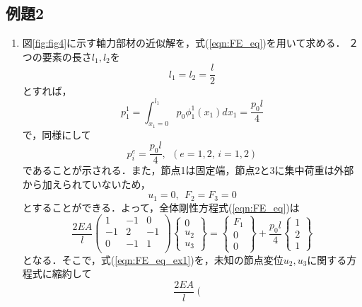 \documentclass[10pt,a4j]{jarticle}
\begin{document}
\subsection{例題2}
\begin{enumerate}
\item
図\ref{fig:fig4}に示す軸力部材の近似解を，式(\ref{eqn:FE_eq})を用いて求める．
２つの要素の長さ$l_1,l_2$を
\begin{equation}
	l_1=l_2=\frac{l}{2}
	\label{eqn:l1_l2}
\end{equation}
とすれば，
\begin{equation}
	p^1_1=\int_{x_1=0}^{l_1}p_0 \phi^1_1(x_1)dx_1=\frac{p_0l}{4}
	\label{eqn:}
\end{equation}
で，同様にして
\begin{equation}
	p^e_i=\frac{p_0l}{4}, \ \ (e=1,2,\, i=1,2)
	\label{eqn:}
\end{equation}
であることが示される．また，節点1は固定端，節点2と3に集中荷重は外部から加えられていないため，
\begin{equation}
	u_1=0, \ \ F_2=F_3=0
\end{equation}
とすることができる．よって，全体剛性方程式(\ref{eqn:FE_eq})は
\begin{equation}
	\frac{2EA}{l}
	\left(
	\begin{array}{ccc}
		1 & -1  & 0 \\
		-1 & 2 & -1 \\
		0 & -1 & 1  \\
	\end{array}
	\right)
	\left\{
	\begin{array}{c}
		0 \\
		u_2 \\
		u_3
	\end{array}
	\right\}
	=
	\left\{
	\begin{array}{c}
		F_1 \\
		0  \\
		0  
	\end{array}
	\right\}
	+
	\frac{p_0l}{4}
	\left\{
	\begin{array}{c}
		1 \\
		2 \\
		1	
	\end{array}
	\right\}
	\label{eqn:FE_eq_ex1}
\end{equation}
となる．そこで，式(\ref{eqn:FE_eq_ex1})を，未知の節点変位$u_2,u_3$に関する方程式に縮約して
\begin{equation}
	\frac{2EA}{l}
	\left(
	\begin{array}{cc}

\end{array}
\end{equation}
\end{enumerate}
\end{document}

